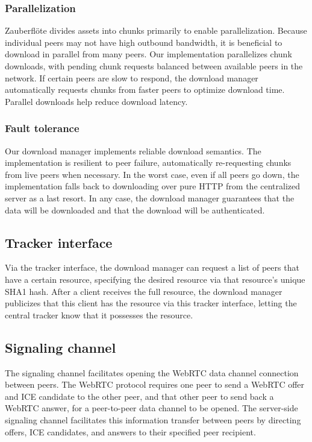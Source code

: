 \documentclass[letterpaper,twocolumn,10pt]{article}
\newcommand{\zbf}{Zauberfl\"{o}te\xspace}
\begin{document}
\subsubsection{Parallelization}

\zbf divides assets into chunks primarily to enable parallelization. Because
individual peers may not have high outbound bandwidth, it is beneficial to
download in parallel from many peers. Our implementation parallelizes chunk
downloads, with pending chunk requests balanced between available peers in the
network. If certain peers are slow to respond, the download manager
automatically requests chunks from faster peers to optimize download time.
Parallel downloads help reduce download latency.

\subsubsection{Fault tolerance}

Our download manager implements reliable download semantics. The implementation
is resilient to peer failure, automatically re-requesting chunks from live
peers when necessary. In the worst case, even if all peers go down, the
implementation falls back to downloading over pure HTTP from the centralized
server as a last resort. In any case, the download manager guarantees that the
data will be downloaded and that the download will be authenticated.

\subsection{Tracker interface}

Via the tracker interface, the download manager can request a list of peers that
have a certain resource, specifying the desired resource via that resource's
unique SHA1 hash. After a client receives the full resource, the download
manager publicizes that this client has the resource via this tracker interface,
letting the central tracker know that it possesses the resource.

\subsection{Signaling channel}

The signaling channel facilitates opening the WebRTC data channel connection between
peers. The WebRTC protocol requires one peer to send a WebRTC offer and ICE candidate
to the other peer, and that other peer to send back a WebRTC answer, for a peer-to-peer
data channel to be opened. The server-side signaling channel facilitates this
information transfer between peers by directing offers, ICE candidates, and answers
to their specified peer recipient.
\end{document}
